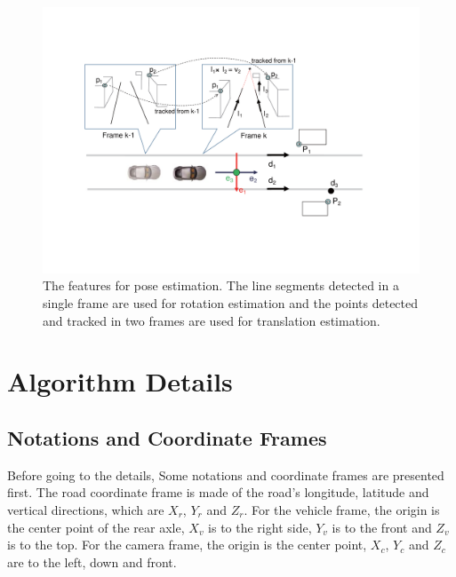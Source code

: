 \documentclass[letterpaper, 10 pt, conference]{ieeeconf}  %
\begin{document}
\begin{figure}
  \centering
  \includegraphics[width=0.9\linewidth]{source//Final//feature.pdf}
  \caption{The features for pose estimation. The line segments detected in a single frame are used for rotation estimation and the points detected and tracked in two frames are used for translation estimation.}
  \label{fig:features_for_estimation}
\end{figure}


\section{Algorithm Details}

\subsection{Notations and Coordinate Frames}
Before going to the details, Some notations and coordinate frames are presented first. The road coordinate frame is made of the road's longitude, latitude and vertical directions, which are $X_r$, $Y_r$ and $Z_r$. For the vehicle frame, the origin is the center point of the rear axle, $X_v$ is to the right side, $Y_v$ is to the front and $Z_v$ is to the top. For the camera frame, the origin is the center point, $X_c$, $Y_c$ and $Z_c$ are to the left, down and front.
\end{document}

